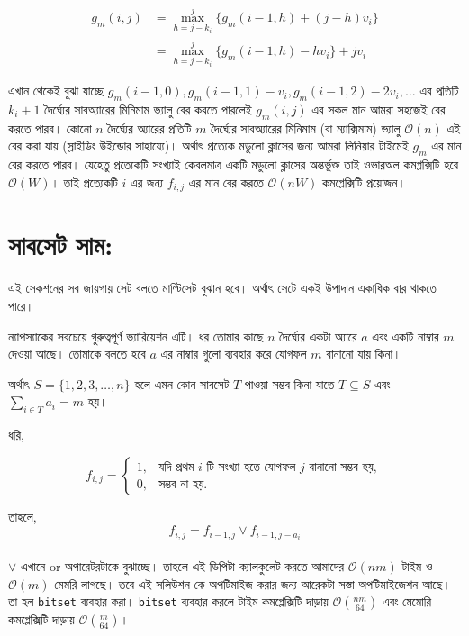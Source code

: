 \begin{align*}
g_m(i, j) & = \max_{h = j - k_{i}}^{j} \lbrace g_{m}(i - 1, h) + (j - h)v_{i} \rbrace \\ 
          & = \max_{h = j - k_{i}}^{j} \lbrace g_{m}(i - 1, h) - hv_{i} \rbrace + jv_{i} 
\end{align*}

এখান থেকেই বুঝা যাচ্ছে \(g_{m}(i - 1, 0), g_{m}(i - 1, 1) - v_{i}, g_{m}(i - 1, 2) - 2v_{i}, \dots\) এর প্রতিটি \(k_{i} + 1\) দৈর্ঘ্যের সাবঅ্যারের মিনিমাম ভ্যালু বের করতে পারলেই  \(g_{m}(i, j)\) এর সকল মান আমরা সহজেই বের করতে পারব। কোনো \(n\) দৈর্ঘ্যের অ্যারের প্রতিটি \(m\) দৈর্ঘ্যের সাবঅ্যারের মিনিমাম (বা ম্যাক্সিমাম) ভ্যালু \(\mathcal{O}(n)\) এই বের করা যায় (স্লাইডিং উইন্ডোর সাহায্যে)। অর্থাৎ প্রত্যেক মডুলো ক্লাসের জন্য আমরা লিনিয়ার টাইমেই \(g_{m}\) এর মান বের করতে পারব। যেহেতু প্রত্যেকটি সংখ্যাই কেবলমাত্র একটি মডুলো ক্লাসের অন্তর্ভুক্ত তাই ওভারঅল কমপ্লক্সিটি হবে \(\mathcal{O}(W)\)। তাই প্রত্যেকটি \(i\) এর জন্য \(f_{i, j}\) এর মান বের করতে \(\mathcal{O}(nW)\) কমপ্লেক্সিটি প্রয়োজন।   

\section{সাবসেট সাম:} 
এই সেকশনের সব জায়গায় সেট বলতে মাল্টিসেট বুঝান হবে। অর্থাৎ সেটে একই উপাদান একাধিক বার থাকতে পারে। 

ন্যাপস্যাকের সবচেয়ে গুরুত্বপূর্ণ ভ্যারিয়েশন এটি। ধর তোমার কাছে \(n\) দৈর্ঘ্যের একটা অ্যারে \(a\) এবং একটি নাম্বার \(m\) দেওয়া আছে। তোমাকে বলতে হবে \(a\) এর নাম্বার গুলো ব্যবহার করে যোগফল \(m\) বানানো যায় কিনা।  

অর্থাৎ \(S = \lbrace 1, 2, 3, \dots, n \rbrace\) হলে এমন কোন সাবসেট \(T\) পাওয়া সম্ভব কিনা যাতে \(T \subseteq S\) এবং \(\sum_{i \in T} a_{i} = m\) হয়। 

ধরি, 
 
\[f_{i, j} = \begin{cases}
  1, & \text{যদি প্রথম } i \text{ টি সংখ্যা হতে যোগফল } j \text{ বানানো সম্ভব হয়}, \\
  0, & \text{সম্ভব না হয়}.
\end{cases}\]

তাহলে, 
\[f_{i, j} = f_{i - 1, j} \lor f_{i - 1, j - a_{i}}\] \\

\(\lor\) এখানে or অপারেটরটাকে বুঝাচ্ছে।  তাহলে এই ডিপিটা ক্যালকুলেট করতে আমাদের \(\mathcal{O}(nm)\) টাইম ও \(\mathcal{O}(m)\) মেমরি লাগছে। তবে এই সলিউশন কে অপটিমাইজ করার জন্য আরেকটা সস্তা অপটিমাইজেশন আছে। তা হল \texttt{bitset} ব্যবহার করা।  \texttt{bitset} ব্যবহার করলে টাইম কমপ্লেক্সিটি দাড়ায় \(\mathcal{O}(\frac{nm}{64})\) এবং মেমোরি কমপ্লেক্সিটি দাড়ায় \(\mathcal{O}(\frac{m}{64})\)। 

